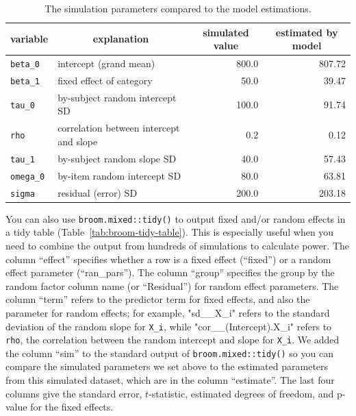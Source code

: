 \documentclass[
  english,
  doc,floatsintext]{apa6}
\begin{document}
\begin{table}[H]

\begin{center}
\begin{threeparttable}

\caption{\label{tab:param-compare}The simulation parameters compared to the model estimations.}

\begin{tabular}{llrr}
\toprule
variable & \multicolumn{1}{c}{explanation} & \multicolumn{1}{c}{simulated value} & \multicolumn{1}{c}{estimated by model}\\
\midrule
\texttt{beta\_0} & intercept (grand mean) & 800.0 & 807.72\\
\texttt{beta\_1} & fixed effect of category & 50.0 & 39.47\\
\texttt{tau\_0} & by-subject random intercept SD & 100.0 & 91.74\\
\texttt{rho} & correlation between intercept and slope & 0.2 & 0.12\\
\texttt{tau\_1} & by-subject random slope SD & 40.0 & 57.43\\
\texttt{omega\_0} & by-item random intercept SD & 80.0 & 63.81\\
\texttt{sigma} & residual (error) SD & 200.0 & 203.18\\
\bottomrule
\end{tabular}

\end{threeparttable}
\end{center}

\end{table}

You can also use \texttt{broom.mixed::tidy()} to output fixed and/or random effects in a tidy table (Table~\ref{tab:broom-tidy-table}). This is especially useful when you need to combine the output from hundreds of simulations to calculate power. The column \enquote{effect} specifies whether a row is a fixed effect (\enquote{fixed}) or a random effect parameter (\enquote{ran\_pars}). The column \enquote{group} specifies the group by the random factor column name (or \enquote{Residual}) for random effect parameters. The column \enquote{term} refers to the predictor term for fixed effects, and also the parameter for random effects; for example, "sd\_\_X\_i" refers to the standard deviation of the random slope for \texttt{X\_i}, while "cor\_\_(Intercept).X\_i" refers to \texttt{rho}, the correlation between the random intercept and slope for \texttt{X\_i}. We added the column \enquote{sim} to the standard output of \texttt{broom.mixed::tidy()} so you can compare the simulated parameters we set above to the estimated parameters from this simulated dataset, which are in the column \enquote{estimate}. The last four columns give the standard error, \(t\)-statistic, estimated degrees of freedom, and p-value for the fixed effects.
\end{document}
